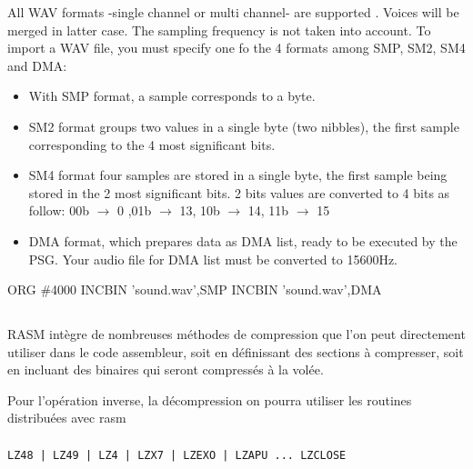 \begin{xen}

All WAV formats -single channel or multi channel- are supported . Voices will be merged in latter case. The sampling frequency is not taken into account.  To import a WAV file, you must specify one fo the 4 formats among SMP, SM2, SM4 and DMA:
\begin{itemize}
\item With SMP format, a sample corresponds to a byte.
\item SM2 format groups two values in a single byte (two nibbles), the first sample corresponding to the 4 most significant bits.
\item SM4 format four samples are stored in a single byte, the first sample being stored in the 2 most significant bits. 2 bits values are converted to 4 bits as follow: 00b $\rightarrow$ 0 ,01b $\rightarrow$ 13, 10b $\rightarrow$ 14, 11b $\rightarrow$ 15
\item DMA format, which prepares data as DMA list, ready to be executed by the PSG. Your audio file for DMA list must be converted to 15600Hz.

\end{itemize}

\end{xen}

\begin{code}
ORG \#4000
INCBIN 'sound.wav',SMP
INCBIN 'sound.wav',DMA
\end{code}

\subsection{}

\begin{xfr}
RASM intègre de nombreuses méthodes de compression que l'on peut directement utiliser dans le code assembleur, soit en définissant des sections à compresser, soit en incluant des binaires qui seront compressés à la volée.

Pour l'opération inverse, la décompression on pourra utiliser les routines distribuées avec rasm
\end{xfr}

\subsubsection{}
\begin{verbatim}
LZ48 | LZ49 | LZ4 | LZX7 | LZEXO | LZAPU ... LZCLOSE
\end{verbatim}

